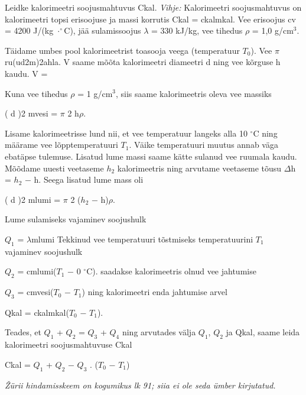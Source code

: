 
Leidke kalorimeetri soojusmahtuvus Ckal.
\textit{Vihje:} Kalorimeetri soojusmahtuvus on kalorimeetri topsi erisoojuse ja massi korrutis Ckal = ckalmkal. Vee erisoojus cv = 4200 J/(kg $\cdot ^\circ$C), jää sulamissoojus $\lambda$ = 330 kJ/kg, vee tihedus $\rho$ = 1,0 g/cm$^3$.

\hint

\solu
Täidame umbes pool kalorimeetrist toasooja veega (temperatuur $T_0$). Vee $\pi$ru(ud2m)2ahla. V saame mõõta kalorimeetri diameetri d ning vee kõrguse h kaudu. V =

Kuna vee tihedus $\rho$ = 1 g/cm$^3$, siis saame kalorimeetris oleva vee massiks

( d )2 mvesi = $\pi$ 2 h$\rho$.

Lisame kalorimeetrisse lund nii, et vee temperatuur langeks alla 10 $^\circ$C ning määrame vee lõpptemperatuuri $T_1$. Väike temperatuuri muutus annab väga ebatäpse tulemuse. Lisatud lume massi saame kätte sulanud vee ruumala kaudu. Mõõdame uuesti veetaseme $h_2$ kalorimeetris ning arvutame veetaseme tõusu $\Delta$h = $h_2$ $-$ h. Seega lisatud lume mass oli

( d )2 mlumi = $\pi$ 2 ($h_2$ $-$ h)$\rho$.

Lume sulamiseks vajaminev soojushulk

$Q_1$ = $\lambda$mlumi Tekkinud vee temperatuuri tõstmiseks temperatuurini $T_1$ vajaminev soojushulk

$Q_2$ = cmlumi($T_1$ $-$ 0 $^\circ$C). saadakse kalorimeetris olnud vee jahtumise

$Q_3$ = cmvesi($T_0$ $-$ $T_1$) ning kalorimeetri enda jahtumise arvel

Qkal = ckalmkal($T_0$ $-$ $T_1$).

Teades, et $Q_1$ + $Q_2$ = $Q_3$ + $Q_4$ ning arvutades välja $Q_1$, $Q_2$ ja Qkal, saame leida kalorimeetri soojusmahtuvuse Ckal

Ckal = $Q_1$ + $Q_2$ $-$ $Q_3$ . ($T_0$ $-$ $T_1$)

\textit{Žürii hindamisskeem on kogumikus lk 91; siia ei ole seda ümber kirjutatud.}
\probend
